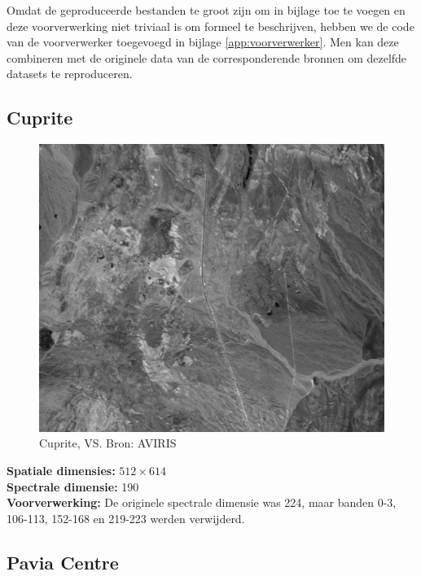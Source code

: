 Omdat de geproduceerde bestanden te groot zijn om in bijlage toe te voegen en deze voorverwerking niet triviaal is om formeel te beschrijven, hebben we de code van de voorverwerker toegevoegd in bijlage \ref{app:voorverwerker}. Men kan deze combineren met de originele data van de corresponderende bronnen om dezelfde datasets te reproduceren.

\subsection{Cuprite}

\begin{figure}[H]
  \centering
  \includegraphics[scale=0.5]{images/cuprite_sum.png}
  \caption{Cuprite, VS. Bron: AVIRIS \cite{ref:cuprite}}
  \label{fig:cuprite_sum}
\end{figure}

\textbf{Spatiale dimensies:} $512 \times 614$\\
\textbf{Spectrale dimensie:} 190\\
\textbf{Voorverwerking:} De originele spectrale dimensie was 224, maar banden 0-3, 106-113, 152-168 en 219-223 werden verwijderd.

\newpage
\subsection{Pavia Centre}

